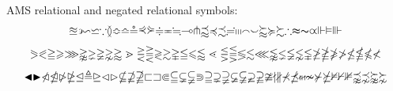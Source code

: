 \documentclass[12pt,a4paper]{article}
\theoremstyle{clearprint}
\begin{document}
\noindent
AMS relational and negated relational symbols: %
\begin{equation}
\approxeq \backepsilon \backsim \backsimeq \because \between \Bumpeq \bumpeq \circeq \curlyeqprec \curlyeqsucc \doteqdot \eqcirc \fallingdotseq \multimap \pitchfork \precapprox \preccurlyeq \precsim \risingdotseq \shortmid \shortparallel \smallfrown \smallsmile \succapprox \succcurlyeq \succsim \therefore \thickapprox \thicksim \varpropto \Vdash \vDash \Vvdash
\end{equation}
\begin{equation}
\eqslantgtr \eqslantless \geqq \geqslant \ggg \gnapprox \gneq \gneqq \gnsim \gtrapprox \gtrdot \gtreqless \gtreqqless \gtrless \gtrsim \gvertneqq \leqq \leqslant \lessapprox \lessdot \lesseqgtr \lesseqqgtr \lessgtr \lesssim \lll \lnapprox \lneq \lneqq \lnsim \lvertneqq \ngeq \ngeqq \ngeqslant \ngtr \nleq \nleqq \nleqslant \nless
\end{equation}
\begin{equation}
\blacktriangleleft \blacktriangleright \ntriangleleft \ntrianglelefteq \ntriangleright \ntrianglerighteq \trianglelefteq \triangleq \trianglerighteq \vartriangleleft \vartriangleright
\nsubseteq \nsupseteq \nsupseteqq \sqsubset \sqsupset \Subset \subseteqq \subsetneq \subsetneqq \Supset \supseteqq \supsetneq \supsetneqq \varsubsetneq \varsubsetneqq \varsupsetneq \varsupsetneqq
\ncong \nmid \nparallel \nprec \npreceq \nshortmid \nshortparallel \nsim \nsucc \nsucceq \nvDash \nvdash \nVDash \precnapprox \precnsim \succnapprox \succnsim
\end{equation}
\end{document}
